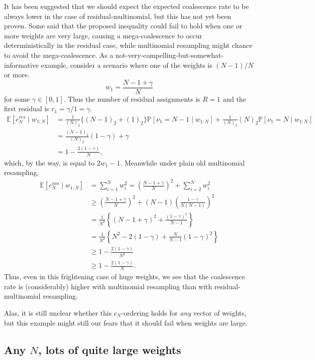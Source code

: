 \documentclass{article}
\newcommand{\Prob}{\mathbb{P}}
\newcommand{\E}{\mathbb{E}}
\newcommand{\1}[1]{\mathbbm{1}_{#1}}
\begin{document}
It has been suggested that we should expect the expected coalescence rate to be always lower in the case of residual-multinomial, but this has not yet been proven.
Some said that the proposed inequality could fail to hold when one or more weights are very large, causing a mega-coalescence to occur deterministically in the residual case, while multinomial resampling might chance to avoid the mega-coalescence.
As a not-very-compelling-but-somewhat-informative example, consider a scenario where one of the weights is $(N-1)/N$ or more.
\begin{equation*}
w_1 = \frac{N-1 +\gamma}{N}
\end{equation*}
for some $\gamma \in [0,1]$.
Thus the number of residual assignments is $R=1$ and the first residual is $r_1 = \gamma/1 = \gamma$.
\begin{align*}
\E[c_N^{res} \mid w_{1:N}] 
&= \frac{1}{(N)_2} \{ (N-1)_2 + (1)_2 \} \Prob[ \nu_1 = N-1 \mid w_{1:N} ]
        + \frac{1}{(N)_2} (N)_2 \Prob[ \nu_1 = N \mid w_{1:N} ] \\
&= \frac{(N-1)_2}{(N)_2} (1-\gamma)  + \gamma \\
&= 1 - \frac{2(1-\gamma)}{N} ,
\end{align*}
which, by the way, is equal to $2w_1 -1$.
Meanwhile under plain old multinomial resampling,
\begin{align*}
\E[c_N^{mn} \mid w_{1:N}] 
&= \sum_{i=1}^N w_i^2
= \left( \frac{N-1 +\gamma}{N} \right)^2 + \sum_{i=2}^N w_i^2 \\
&\geq \left( \frac{N-1 +\gamma}{N} \right)^2 
        + (N-1)\left( \frac{1-\gamma}{N(N-1)} \right)^2 \\
&= \frac{1}{N^2} \left\{ (N-1+\gamma)^2 + \frac{(1-\gamma)^2}{N-1} \right\} \\
&= \frac{1}{N^2} \left\{ N^2 - 2(1-\gamma) + \frac{N}{N-1}(1-\gamma)^2 \right\} \\
&\geq 1 - \frac{2(1-\gamma)}{N^2} \\
&\geq 1 - \frac{2(1-\gamma)}{N} .
\end{align*}
Thus, even in this frightening case of huge weights, we see that the coalescence rate is (considerably) higher with multinomial resampling than with residual-multinomial resampling.

Alas, it is still unclear whether this $c_N$-ordering holds for \emph{any} vector of weights, but this example might still our fears that it should fail when weights are large.


\subsection{Any $N$, lots of quite large weights}
\end{document}
